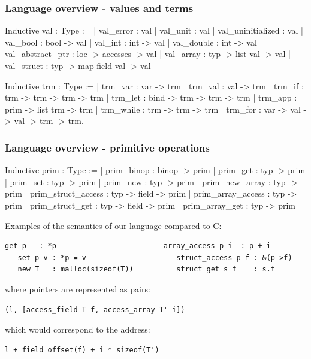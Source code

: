 \begin{frame}[fragile]
\frametitle{Language overview - values and terms}

\begin{coqs}
Inductive val : Type :=
  | val_error : val
  | val_unit : val
  | val_uninitialized : val
  | val_bool : bool -> val
  | val_int : int -> val
  | val_double : int -> val
  | val_abstract_ptr : loc -> accesses -> val
  | val_array : typ -> list val -> val
  | val_struct : typ -> map field val -> val
\end{coqs}

\begin{coqs}
Inductive trm : Type :=
  | trm_var : var -> trm
  | trm_val : val -> trm
  | trm_if : trm -> trm -> trm -> trm
  | trm_let : bind -> trm -> trm -> trm
  | trm_app : prim -> list trm -> trm
  | trm_while : trm -> trm -> trm
  | trm_for : var -> val -> val -> trm -> trm.
\end{coqs}

\end{frame}


\begin{frame}[fragile]
\frametitle{Language overview - primitive operations}

\begin{coqs}
  Inductive prim : Type :=
    | prim_binop : binop -> prim
    | prim_get : typ -> prim
    | prim_set : typ -> prim
    | prim_new : typ -> prim
    | prim_new_array : typ -> prim
    | prim_struct_access : typ -> field -> prim
    | prim_array_access : typ -> prim
    | prim_struct_get : typ -> field -> prim
    | prim_array_get : typ -> prim
\end{coqs}
\pause
Examples of the semantics of our language compared to C:

\begin{Verbatim}[fontsize=\scriptsize]
   get p   : *p                         array_access p i  : p + i
   set p v : *p = v                     struct_access p f : &(p->f)
   new T   : malloc(sizeof(T))          struct_get s f    : s.f
\end{Verbatim}

where pointers are represented as pairs:

\begin{Verbatim}[fontsize=\scriptsize]
   (l, [access_field T f, access_array T' i]) 
\end{Verbatim}

which would correspond to the address:

\begin{Verbatim}[fontsize=\scriptsize]
   l + field_offset(f) + i * sizeof(T')
\end{Verbatim}

\end{frame}


